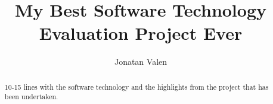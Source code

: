 \documentclass[11pt]{article}
\begin{document}
\title{My Best Software Technology Evaluation Project Ever}

\author{Jonatan Valen}

\maketitle

\begin{abstract}

  10-15 lines with the software technology and the highlights from the
  project that has been undertaken.

\end{abstract}

%














{}
\end{document}
